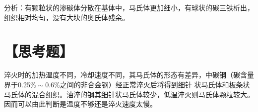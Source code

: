 \documentclass[a4paper,utf8]{article}
\begin{document}
分析：有颗粒状的渗碳体分散在基体中，马氏体更加细小，有球状的碳三铁析出，组织相对均匀，没有大块的奥氏体残余。

\section*{【思考题】}

淬火时的加热温度不同，冷却速度不同，其马氏体的形态有差异，中碳钢（碳含量界于0.25$\% \sim $0.6$\%$之间的非合金钢）经正常淬火后将得到细针
状马氏体和板条状马氏体的混合组织。油淬的钢其细针状马氏体较少，低温淬火则马氏体颗粒较大。
因而可以由此判断是温度不够还是淬火速度太慢。
\end{document}
